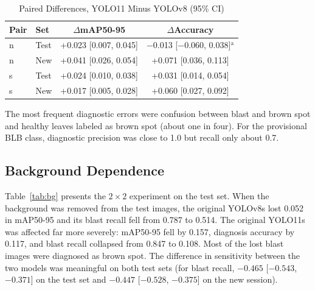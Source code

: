 \documentclass[conference]{IEEEtran}
\begin{document}
\begin{table}[htbp]
\caption{Paired Differences, YOLO11 Minus YOLOv8 (95\% CI)}
\begin{center}
\setlength{\tabcolsep}{2pt}
\begin{tabular}{|l|l|c|c|}
\hline
\textbf{Pair} & \textbf{Set} & \textbf{$\Delta$mAP50-95} & \textbf{$\Delta$Accuracy} \\
\hline
n & Test & +0.023 [0.007, 0.045] & $-$0.013 [$-$0.060, 0.038]$^{\mathrm{a}}$ \\
n & New & +0.041 [0.026, 0.054] & +0.071 [0.036, 0.113] \\
s & Test & +0.024 [0.010, 0.038] & +0.031 [0.014, 0.054] \\
s & New & +0.017 [0.005, 0.028] & +0.060 [0.027, 0.092] \\
\hline
\end{tabular}
\par{}
\label{tab:paired}
\end{center}
\end{table}

The most frequent diagnostic errors were confusion between blast and brown spot and healthy leaves labeled as brown spot (about one in four). For the provisional BLB class, diagnostic precision was close to 1.0 but recall only about 0.7.

\subsection{Background Dependence}
Table~\ref{tab:bg} presents the $2\times2$ experiment on the test set. When the background was removed from the test images, the original YOLOv8s lost 0.052 in mAP50-95 and its blast recall fell from 0.787 to 0.514. The original YOLO11s was affected far more severely: mAP50-95 fell by 0.157, diagnosis accuracy by 0.117, and blast recall collapsed from 0.847 to 0.108. Most of the lost blast images were diagnosed as brown spot. The difference in sensitivity between the two models was meaningful on both test sets (for blast recall, $-0.465$ [$-0.543$, $-0.371$] on the test set and $-0.447$ [$-0.528$, $-0.375$] on the new session).
\end{document}
